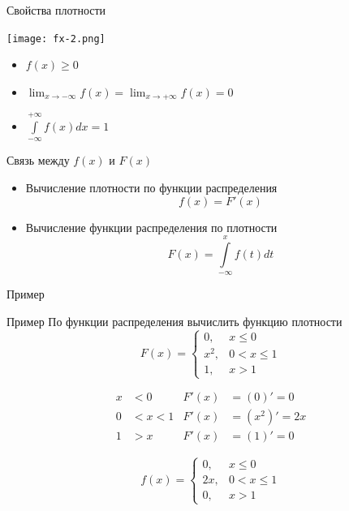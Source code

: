 \documentclass[unicode,11pt,notheorems,xcolor=table]{beamer}
\begin{document}
\begin{frame}{Свойства плотности}{}
    {\centering
        \texttt{[image: fx-2.png]}    
    \par}

    \vspace{-7mm}
    \begin{itemize}
        \item $\displaystyle f(x) \geqslant 0$ 
        \item $\displaystyle \lim_{x \to -\infty} f(x) = \lim_{x \to +\infty} f(x) =0$
        \item $\displaystyle \int\limits_{-\infty}^{+\infty} f(x)dx = 1 $
    \end{itemize}
\end{frame}

\begin{frame}{Связь между $f(x)$ и $F(x)$}{}
\begin{itemize}
    \item Вычисление плотности по функции распределения
    $$
        f(x)=F'(x)
    $$
    \item Вычисление функции распределения по плотности
    $$
        F(x) = \int\limits_{-\infty}^x f(t)dt
    $$
\end{itemize}
\end{frame}

\begin{frame}{Пример}{}

    \begin{exampleblock}{Пример}
        По функции распределения вычислить функцию плотности
        $$
            F(x) = \begin{cases}
                0, & x\leqslant 0\\
                x^2, & 0<x\leqslant 1\\
                1, &  x>1
        \end{cases}
        $$
    \end{exampleblock}

    \vspace{-6mm}
    \begin{align*}
        x & < 0 & F'(x) &=(0)' = 0\\
        0 &<x< 1  & F'(x) &= (x^2)'=2x \\
        1 &> x  & F'(x) &= (1)'=0 
    \end{align*}

    \vspace{-8mm}
    $$
    f(x) = \begin{cases}
        0, & x\leqslant 0\\
        2x, & 0<x\leqslant 1\\
        0, &  x>1
    \end{cases}
    $$
\end{frame}
\end{document}
